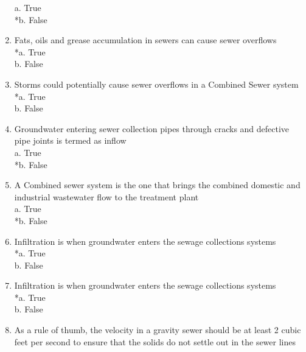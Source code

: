 \begin{enumerate}
a. True \\
*b. False \\

\item  Fats, oils and grease accumulation in sewers can cause sewer overflows \\

*a. True \\
b. False \\

\item  Storms could potentially cause sewer overflows in a Combined Sewer system  \\

*a. True \\
b. False \\

\item  Groundwater entering sewer collection pipes through cracks and defective pipe joints is termed as inflow \\

a. True \\
*b. False \\

\item  A Combined sewer system is the one that brings the combined domestic and industrial wastewater flow to the treatment plant \\

a. True \\
*b. False \\

\item  Infiltration is when groundwater enters the sewage collections systems \\

*a. True \\
b. False \\

\item  Infiltration is when groundwater enters the sewage collections systems \\

*a. True \\
b. False \\

\item  As a rule of thumb, the velocity in a gravity sewer should be at least 2 cubic feet per second to ensure that the solids do not settle out in the sewer lines\\


\end{enumerate}
